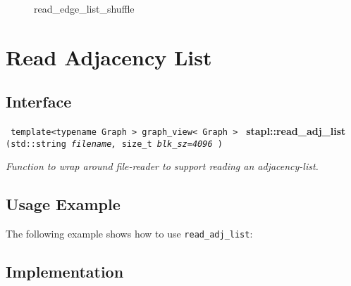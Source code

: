 \begin{figure}[p]
\caption{ read\_edge\_list\_shuffle}%
\label{fig:rd-edge-list-shuf-alg-exec-exper}
\end{figure}


\section{Read Adjacency List}
\label{sec-rd-adj-list-alg}

\subsection{Interface} \label{sec-rd-adj-list-alg-inter}

\noindent
\texttt{%
template<typename Graph >
\newline
graph\_view< Graph > 	
}
\newline
\textbf{stapl::read\_adj\_list}%
\newline
\texttt{%
(std::string 
\textit{filename,}%
size\_t 
\textit{blk\_sz=4096}%
)
}
\vspace{0.4cm}

\textit{
Function to wrap around file-reader to support reading an adjacency-list. 
}
\vspace{0.4cm}

\subsection{Usage Example} \label{sec-rd-adj-list-alg-use}

The following example shows how to use 
\texttt{read\_adj\_list}:


\subsection{Implementation} \label{sec-rd-adj-list-alg-impl}

